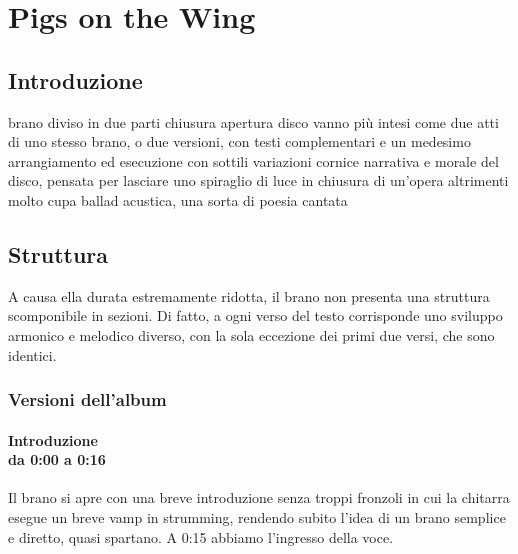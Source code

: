 \documentclass[class=book, crop=false, oneside, 12pt]{standalone}
\begin{document}
    \chapter{Pigs on the Wing}
    


    \section{Introduzione}
    brano diviso in due parti chiusura apertura disco
    vanno più intesi come due atti di uno stesso brano, o due versioni, con testi complementari e un medesimo arrangiamento ed esecuzione con sottili variazioni
    cornice narrativa e morale del disco, pensata per lasciare uno spiraglio di luce in chiusura di un'opera altrimenti molto cupa
    ballad acustica, una sorta di poesia cantata

    \section{Struttura}
    A causa ella durata estremamente ridotta, il brano non presenta una struttura scomponibile in sezioni. Di fatto, a ogni verso del testo corrisponde uno sviluppo armonico e melodico diverso, con la sola eccezione dei primi due versi, che sono identici. 

    \subsection{Versioni dell'album}

    \subsubsection*{Introduzione\\ \small{da 0:00 a 0:16}}
    Il brano si apre con una breve introduzione senza troppi fronzoli in cui la chitarra esegue un breve vamp in strumming, rendendo subito l'idea di un brano semplice e diretto, quasi spartano. A 0:15 abbiamo l'ingresso della voce.
    
\end{document}
